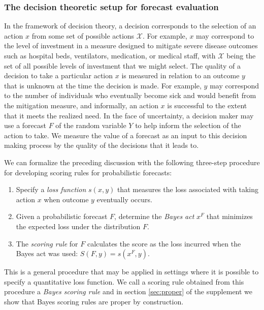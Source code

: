 \documentclass{article}\usepackage[]{graphicx}\usepackage[]{xcolor}
\begin{document}
\subsubsection{The decision theoretic setup for forecast evaluation}
\label{sec:methods.detailed.decisiontheory}


In the framework of decision theory, a decision corresponds to the selection of an action $x$ from some set of possible actions $\mathcal{X}$. For example, $x$ may correspond to the level of investment in a measure designed to mitigate severe disease outcomes such as hospital beds, ventilators, medication, or medical staff, with $\mathcal{X}$ being the set of all possible levels of investment that we might select. The quality of a decision to take a particular action $x$ is measured in relation to an outcome $y$ that is unknown at the time the decision is made. For example, $y$ may correspond to the number of individuals who eventually become sick and would benefit from the mitigation measure, and informally, an action $x$ is successful to the extent that it meets the realized need. In the face of uncertainty, a decision maker may use a forecast $F$ of the random variable $Y$ to help inform the selection of the action to take. We measure the value of a forecast as an input to this decision making process by the quality of the decisions that it leads to.

We can formalize the preceding discussion with the following three-step procedure for developing scoring rules for probabilistic forecasts:
\begin{enumerate}
\item Specify a \emph{loss function} $s(x, y)$ that measures the loss associated with taking action $x$ when outcome $y$ eventually occurs.
\item Given a probabilistic forecast $F$, determine the \emph{Bayes act} $x^F$ that minimizes the expected loss under the distribution $F$.
\item The \emph{scoring rule} for $F$ calculates the score as the loss incurred when the Bayes act was used: $S(F, y) = s(x^F, y)$.
\end{enumerate}
This is a general procedure that may be applied in settings where it is possible to specify a quantitative loss function. We call a scoring rule obtained from this procedure a \emph{Bayes scoring rule} and in section \ref{sec:proper} of the
supplement we show that Bayes scoring rules are proper by construction.
\end{document}
